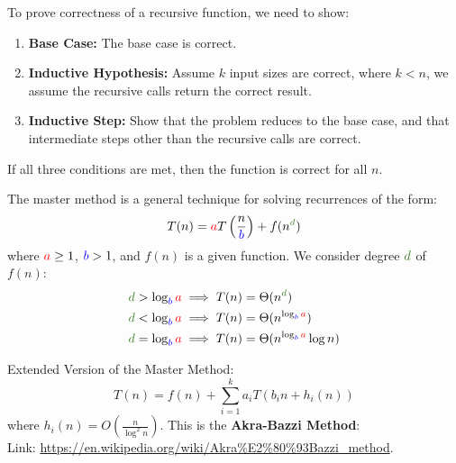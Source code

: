 \newpage

\begin{theo}

    To prove correctness of a recursive function, we need to show:
    \begin{enumerate}
        \item \textbf{Base Case:} The base case is correct.
        \item \textbf{Inductive Hypothesis:} Assume $k$ input sizes are correct, where $k<n$, we assume 
        the recursive calls return the correct result.
        \item \textbf{Inductive Step:} Show that the problem reduces to the base case, and that intermediate steps other than the recursive calls are correct.
    \end{enumerate}
    If all three conditions are met, then the function is correct for all $n$.
\end{theo}

\begin{theo}

    \label{theo:master}

    The master method is a general technique for solving recurrences of the form:
    \begin{equation*}
        T(n) = \textcolor{red}{a}T\left(\dfrac{n}{\textcolor{blue}{b}}\right) + f(n^{\textcolor{OliveGreen}{d}})
        \end{equation*}
        where $\textcolor{red}{a} \geq 1$, $\textcolor{blue}{b} > 1$, and $f(n)$ is a given function. We consider degree $\textcolor{OliveGreen}{d}$ of $f(n)$:
        \begin{align*}
        \textcolor{OliveGreen}{d} > \log_{\textcolor{blue}{b}} \textcolor{red}{a} &\implies T(n) = \Theta(n^{\textcolor{OliveGreen}{d}}) \\
        \textcolor{OliveGreen}{d} < \log_{\textcolor{blue}{b}} \textcolor{red}{a} &\implies T(n) = \Theta(n^{\log_{\textcolor{blue}{b}} \textcolor{red}{a}}) \\
        \textcolor{OliveGreen}{d} = \log_{\textcolor{blue}{b}} \textcolor{red}{a} &\implies T(n) = \Theta(n^{\log_{\textcolor{blue}{b}} \textcolor{red}{a}} \log n)
        \end{align*}
    
\end{theo}

\begin{Tip}
    Extended Version of the Master Method:
    \\ $$T(n) = f(n) + \sum_{i=1}^{k} a_i T(b_i n + h_i(n))$$
    where  $h_i(n) = O\left( \frac{n}{\log^2 n} \right)$. This is the \textbf{Akra-Bazzi Method}:\\
    Link: \url{https://en.wikipedia.org/wiki/Akra%E2%80%93Bazzi_method}.
\end{Tip}

